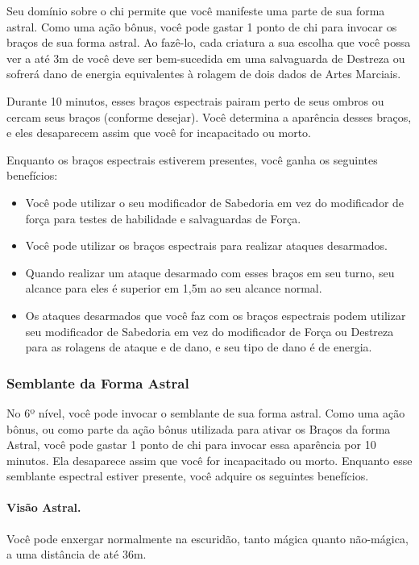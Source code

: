 \begin{multicols}{2}
Seu domínio sobre o chi permite que você manifeste uma parte de sua forma
astral. Como uma ação bônus, você pode gastar 1 ponto de chi para invocar os
braços de sua forma astral. Ao fazê-lo, cada criatura a sua escolha que você
possa ver a até 3m de você deve ser bem-sucedida em uma salvaguarda de Destreza
ou sofrerá dano de energia equivalentes à rolagem de dois dados de Artes
Marciais.

Durante 10 minutos, esses braços espectrais pairam perto de seus ombros ou
cercam seus braços (conforme desejar). Você determina a aparência desses braços,
e eles desaparecem assim que você for incapacitado ou morto.

Enquanto os braços espectrais estiverem presentes, você ganha os seguintes
benefícios:

\begin{itemize}
    \item Você pode utilizar o seu modificador de Sabedoria em vez do
        modificador de força para testes de habilidade e salvaguardas de Força.
    \item Você pode utilizar os braços espectrais para realizar ataques
        desarmados.
    \item Quando realizar um ataque desarmado com esses braços em seu turno, seu
        alcance para eles é superior em 1,5m ao seu alcance normal.
    \item Os ataques desarmados que você faz com os braços espectrais podem
        utilizar seu modificador de Sabedoria em vez do modificador de Força ou
        Destreza para as rolagens de ataque e de dano, e seu tipo de dano é de
        energia.
\end{itemize}

\subsubsection*{Semblante da Forma Astral}%
\label{ssub:semblante_da_forma_astral}

No 6º nível, você pode invocar o semblante de sua forma astral. Como uma ação
bônus, ou como parte da ação bônus utilizada para ativar os Braços da forma
Astral, você pode gastar 1 ponto de chi para invocar essa aparência por 10
minutos. Ela desaparece assim que você for incapacitado ou morto. Enquanto esse
semblante espectral estiver presente, você adquire os seguintes benefícios.

\paragraph{Visão Astral.}%
Você pode enxergar normalmente na escuridão, tanto mágica quanto não-mágica, a
uma distância de até 36m.


\end{multicols}
